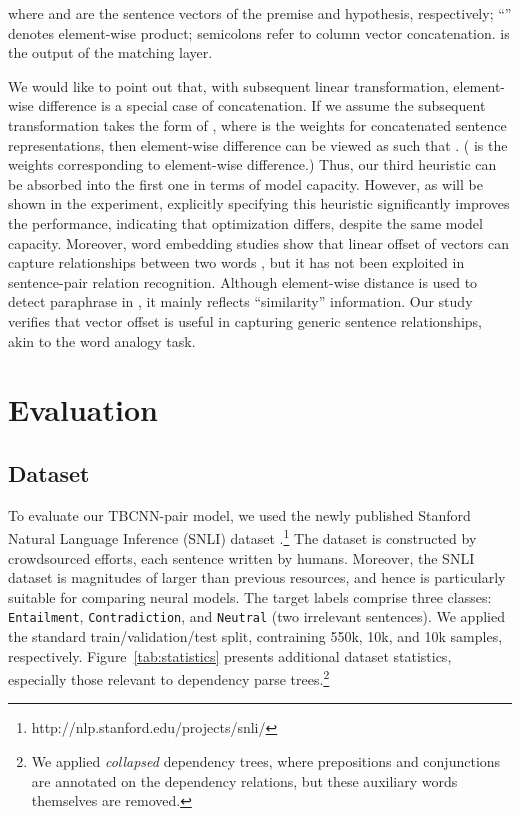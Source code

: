 \documentclass[11pt]{article}
\begin{document}
\noindent where  and  are the sentence vectors of the premise and hypothesis, respectively; ``'' denotes element-wise product; semicolons refer to column vector concatenation.  is the output of the matching layer.

We would like to point out that, with subsequent linear transformation, element-wise difference is a special case of concatenation. 
If we assume the subsequent transformation takes the form of ,
where  is the weights for concatenated sentence representations, then element-wise difference can be viewed as such that . ( is the weights corresponding to element-wise difference.)
Thus, our third heuristic can be absorbed into the first one in terms of model capacity. However, as will be shown in the experiment, explicitly specifying this heuristic significantly improves the performance, indicating that optimization differs, despite the same model capacity.
Moreover, word embedding studies show that linear offset of vectors can capture
relationships between two words \cite{offset}, but it has not been exploited in sentence-pair relation recognition. Although element-wise distance is used to detect paraphrase in , it mainly reflects ``similarity'' information. Our study verifies that vector offset is useful in capturing generic sentence relationships, akin to the word analogy task.

\vspace{-.1cm plus 0cm minus 0cm}
\section{Evaluation}\label{sec:Result}
\vspace{-.2cm plus 0cm minus 0cm}
\subsection{Dataset}\label{ss:dataset}
\vspace{-.1cm plus 0cm minus 0cm}

To evaluate our TBCNN-pair model, we used the newly published Stanford Natural Language Inference (SNLI) dataset \cite{NLI}.\footnote{http://nlp.stanford.edu/projects/snli/
} The dataset is constructed by crowdsourced efforts, each sentence written by humans. 
Moreover, the SNLI dataset is magnitudes of larger than previous resources, and hence is particularly suitable for comparing neural models.
The target labels comprise three classes: {\tt Entailment}, {\tt Contradiction}, and {\tt Neutral} (two irrelevant sentences). We applied the standard train/validation/test split, contraining 550k, 10k, and 10k samples, respectively. Figure~\ref{tab:statistics} presents additional dataset statistics, especially those relevant to dependency parse trees.\footnote{We applied \textit{collapsed} dependency trees, where prepositions and conjunctions are annotated on the dependency relations, but these auxiliary words themselves are removed.}
\end{document}
